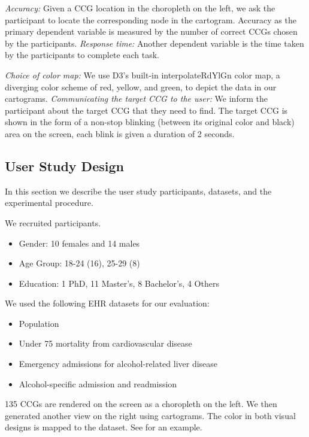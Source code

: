 \textit{Accuracy:} Given a CCG location in the choropleth on the left, we ask the participant to locate the corresponding node in the cartogram. Accuracy as the primary dependent variable is measured by the number of correct CCGs chosen by the participants. \textit{Response time:} Another dependent variable is the time taken by the participants to complete each task.

\textit{Choice of color map:} We use D3's built-in interpolateRdYlGn color map, a diverging color scheme of red, yellow, and green, to depict the data in our cartograms. \textit{Communicating the target CCG to the user:} We inform the participant about the target CCG that they need to find. The target CCG is shown in the form of a non-stop blinking (between its original color and black) area on the screen, each blink is given a duration of 2 seconds.

\subsection{User Study Design}
In this section we describe the user study participants, datasets, and the experimental procedure.

 We recruited \pCount participants.

\begin{itemize}
    \item Gender: 10 females and 14 males
    \item Age Group: 18-24 (16), 25-29 (8)
    \item Education: 1 PhD, 11 Master's, 8 Bachelor's, 4 Others
\end{itemize}

 We used the following EHR datasets for our evaluation:

\begin{itemize}
    \item Population
    \item Under 75 mortality from cardiovascular disease
    \item Emergency admissions for alcohol-related liver disease
    \item Alcohol-specific admission and readmission
\end{itemize}

135 CCGs are rendered on the screen as a choropleth on the left. We then generated another view on the right using cartograms. The color in both visual designs is mapped to the dataset. See  for an example.

